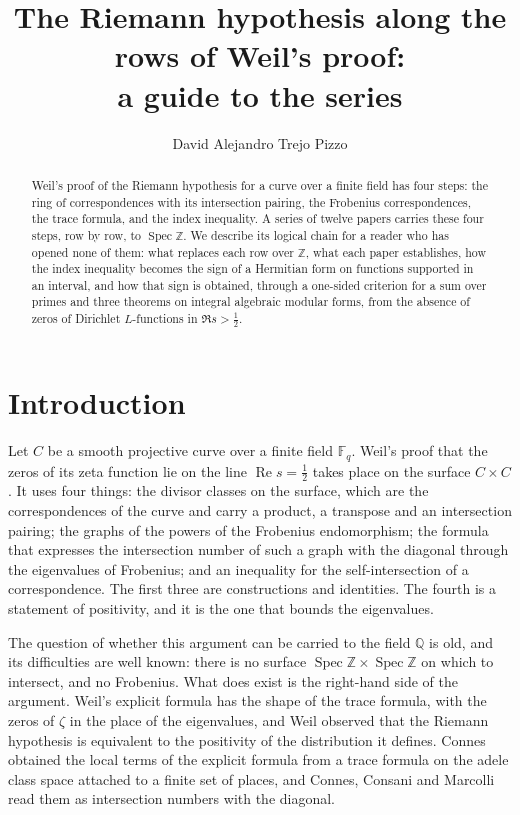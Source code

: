 \documentclass[10pt]{amsart}
\theoremstyle{definition}
\theoremstyle{remark}
\newcommand{\Z}{\mathbb Z}
\newcommand{\Q}{\mathbb Q}
\newcommand{\F}{\mathbb F}
\newcommand{\Rel}{\operatorname{Re}}
\begin{document}
\addtolength{\abovedisplayskip}{-2pt}
\addtolength{\belowdisplayskip}{-2pt}
\title[The Riemann hypothesis along the rows of Weil's proof]{The Riemann hypothesis along the rows of Weil's proof:\\ a guide to the series}
\author{David Alejandro Trejo Pizzo}
\date{}
\begin{abstract}
Weil's proof of the Riemann hypothesis for a curve over a finite field has four steps: the ring
of correspondences with its intersection pairing, the Frobenius correspondences, the trace
formula, and the index inequality. A series of twelve papers carries these four steps, row by
row, to $\operatorname{Spec}\mathbb Z$. We describe its logical chain for a reader who has opened
none of them: what replaces each row over $\mathbb Z$, what each paper establishes, how the
index inequality becomes the sign of a Hermitian form on functions supported in an interval,
and how that sign is obtained, through a one-sided criterion for a sum over primes and three
theorems on integral algebraic modular forms, from the absence of zeros of Dirichlet
$L$-functions in $\Re s>\tfrac12$.
\end{abstract}
\maketitle

\section{Introduction}\label{sec:intro}
Let $C$ be a smooth projective curve over a finite field $\F_q$. Weil's proof that the zeros of
its zeta function lie on the line $\Rel s=\tfrac12$ takes place on the surface $C\times C$
\cite{Weil1948}. It uses four things: the divisor classes on the surface, which are the
correspondences of the curve and carry a product, a transpose and an intersection pairing; the
graphs of the powers of the Frobenius endomorphism; the formula that expresses the intersection
number of such a graph with the diagonal through the eigenvalues of Frobenius; and an
inequality for the self-intersection of a correspondence. The first three are constructions and
identities. The fourth is a statement of positivity, and it is the one that bounds the eigenvalues.

The question of whether this argument can be carried to the field $\Q$ is old, and its
difficulties are well known: there is no surface
$\operatorname{Spec}\Z\times\operatorname{Spec}\Z$ on which to intersect, and no Frobenius.
What does exist is the right-hand side of the argument. Weil's explicit formula \cite{Weil52}
has the shape of the trace formula, with the zeros of $\zeta$ in the place of the eigenvalues,
and Weil observed that the Riemann hypothesis is equivalent to the positivity of the
distribution it defines. Connes \cite{Connes99} obtained the local terms of the explicit formula
from a trace formula on the adele class space attached to a finite set of places, and Connes,
Consani and Marcolli \cite{CCM} read them as intersection numbers with the diagonal.
\end{document}
